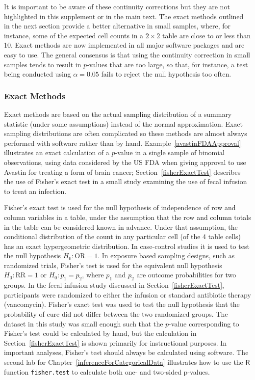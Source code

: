 It is important to be aware of these continuity corrections but they are not highlighted in this supplement or in the main text. The exact methods outlined in the next section provide a better alternative in small samples, where, for instance, some of the expected cell counts in a $2 \times 2$ table are close to or less than 10.  Exact methods are now implemented in all major software packages and are easy to use.   The general consensus is that using the continuity correction in small samples tends to result in $p$-values that are too large, so that, for instance, a test being conducted using $\alpha = 0.05$ fails to reject the null hypothesis too often.


\subsubsection{Exact Methods}

Exact methods are based on the actual sampling distribution of a summary statistic (under some assumptions) instead of the normal approximation.  Exact sampling distributions are often complicated so these methods are almost always performed with software rather than by hand. Example~\ref{avastinFDAApproval} illustrates an exact calculation of a $p$-value in a single sample of binomial observations, using data considered by the US FDA when giving approval to use Avastin for treating a form of brain cancer; Section~\ref{fisherExactTest} describes the use of Fisher's exact test in a small study examining the use of fecal infusion to treat an infection.
 
Fisher's exact test is used for the null hypothesis of independence of row and column variables in a table, under the assumption that the row and column totals in the table can be considered known in advance.  Under that assumption, the conditional distribution of the count in any particular cell (of the 4 table cells) has an exact hypergeometric distribution. In case-control studies it is used to test the null hypothesis $H_0: \text{OR} = 1$.    In exposure based sampling designs, such as randomized trials, Fisher's test is used for the equivalent null hypothesis $H_0: \text{RR} = 1$ or $H_0: p_1 = p_2$, where $p_1$ and $p_2$ are outcome probabilities for two groups. In the fecal infusion study discussed in Section~\ref{fisherExactTest}, participants were randomized to either the infusion or standard antibiotic therapy (vancomycin). Fisher's exact test was used to test the null hypothesis that the probability of cure did not differ between the two randomized groups.  The dataset in this study was small enough such that the $p$-value corresponding to Fisher's test could be calculated by hand, but the calculation in Section~\ref{fisherExactTest} is shown primarily for instructional purposes. In important analyses, Fisher's test should always be calculated using software.  The second lab for Chapter~\ref{inferenceForCategoricalData} illustrates how to use the $\textsf{R}$ function \texttt{fisher.test} to calculate both one- and two-sided p-values.

